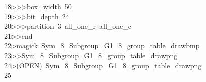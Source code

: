 \begin{tabbing}
18\>$\triangleright$\>$\triangleright$\>$\triangleright$\>box\_width\ 50\ \\[0pt]
19\>$\triangleright$\>$\triangleright$\>$\triangleright$\>bit\_depth\ 24\ \\[0pt]
20\>$\triangleright$\>$\triangleright$\>$\triangleright$\>partition\ 3\ all\_one\_r\ all\_one\_c\ \\[0pt]
21\>$\triangleright$\>$\triangleright$\>end\\[0pt]
22\>$\triangleright$\>magick\ Sym\_8\_Subgroup\_G1\_8\_group\_table\_drawbmp\ \\[0pt]
23\>$\triangleright$\>$\triangleright$\>Sym\_8\_Subgroup\_G1\_8\_group\_table\_drawpng\\[0pt]
24\>$\triangleright$\>(OPEN)\ Sym\_8\_Subgroup\_G1\_8\_group\_table\_drawpng\\[0pt]
25\>\end{tabbing}
